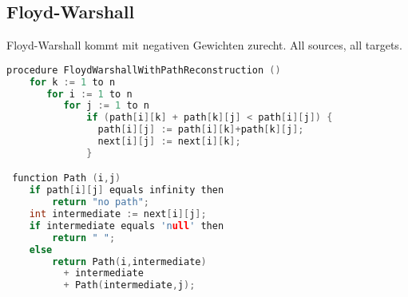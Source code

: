 \subsection{Floyd-Warshall}
Floyd-Warshall kommt mit negativen Gewichten zurecht. All sources, all targets.
\begin{lstlisting}[language=C++]
procedure FloydWarshallWithPathReconstruction ()
    for k := 1 to n
       for i := 1 to n
          for j := 1 to n
              if (path[i][k] + path[k][j] < path[i][j]) {
                path[i][j] := path[i][k]+path[k][j];
                next[i][j] := next[i][k]; 
              }

 function Path (i,j)
    if path[i][j] equals infinity then
        return "no path";
    int intermediate := next[i][j];
    if intermediate equals 'null' then
        return " ";
    else
        return Path(i,intermediate) 
          + intermediate 
          + Path(intermediate,j);
\end{lstlisting}
